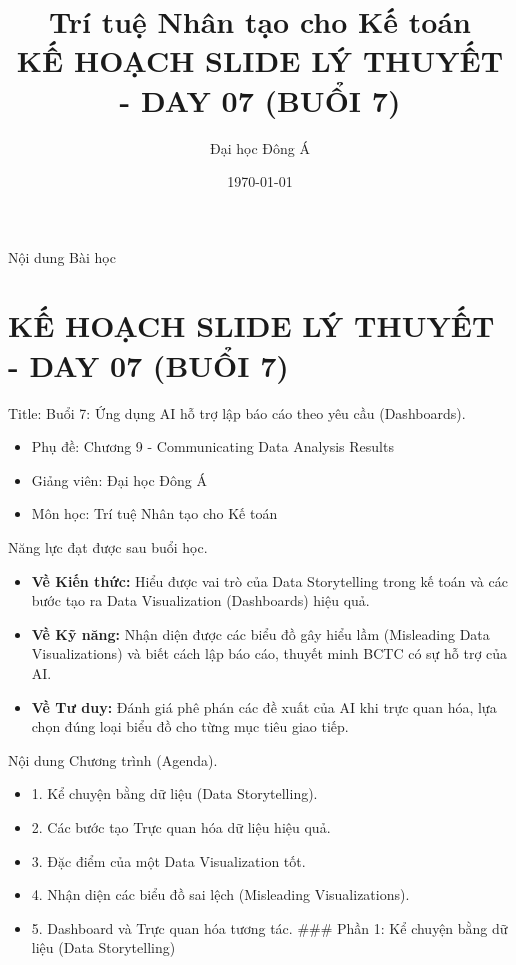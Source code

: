 \documentclass[aspectratio=169]{beamer}
\title[Trí tuệ Nhân tạo cho Kế toán]{Trí tuệ Nhân tạo cho Kế toán \\ \vspace{0.3cm} \Large KẾ HOẠCH SLIDE LÝ THUYẾT - DAY 07 (BUỔI 7)}
\author{Đại học Đông Á}
\date{\today}
\begin{document}
\begin{frame}
    \titlepage
\end{frame}

\begin{frame}{Nội dung Bài học}
    \tableofcontents
\end{frame}


\section{KẾ HOẠCH SLIDE LÝ THUYẾT - DAY 07 (BUỔI 7)}


\begin{frame}{Title: Buổi 7: Ứng dụng AI hỗ trợ lập báo cáo theo yêu cầu (Dashboards).}
    \begin{itemize}
        \item Phụ đề: Chương 9 - Communicating Data Analysis Results
        \item Giảng viên: Đại học Đông Á
        \item Môn học: Trí tuệ Nhân tạo cho Kế toán
    \end{itemize}
\end{frame}


\begin{frame}{Năng lực đạt được sau buổi học.}
    \begin{itemize}
        \item \textbf{Về Kiến thức:} Hiểu được vai trò của Data Storytelling trong kế toán và các bước tạo ra Data Visualization (Dashboards) hiệu quả.
        \item \textbf{Về Kỹ năng:} Nhận diện được các biểu đồ gây hiểu lầm (Misleading Data Visualizations) và biết cách lập báo cáo, thuyết minh BCTC có sự hỗ trợ của AI.
        \item \textbf{Về Tư duy:} Đánh giá phê phán các đề xuất của AI khi trực quan hóa, lựa chọn đúng loại biểu đồ cho từng mục tiêu giao tiếp.
    \end{itemize}
\end{frame}


\begin{frame}{Nội dung Chương trình (Agenda).}
    \begin{itemize}
        \item 1. Kể chuyện bằng dữ liệu (Data Storytelling).
        \item 2. Các bước tạo Trực quan hóa dữ liệu hiệu quả.
        \item 3. Đặc điểm của một Data Visualization tốt.
        \item 4. Nhận diện các biểu đồ sai lệch (Misleading Visualizations).
        \item 5. Dashboard và Trực quan hóa tương tác.
        ### Phần 1: Kể chuyện bằng dữ liệu (Data Storytelling)
    \end{itemize}
\end{frame}
\end{document}
